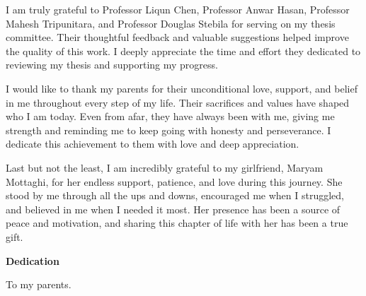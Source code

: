 I am truly grateful to Professor Liqun Chen, Professor Anwar Hasan, Professor Mahesh Tripunitara, and Professor Douglas Stebila for serving on my thesis committee. Their thoughtful feedback and valuable suggestions helped improve the quality of this work. I deeply appreciate the time and effort they dedicated to reviewing my thesis and supporting my progress.

I would like to thank my parents for their unconditional love, support, and belief in me throughout every step of my life. Their sacrifices and values have shaped who I am today. Even from afar, they have always been with me, giving me strength and reminding me to keep going with honesty and perseverance. I dedicate this achievement to them with love and deep appreciation.

Last but not the least, I am incredibly grateful to my girlfriend, Maryam Mottaghi, for her endless support, patience, and love during this journey. She stood by me through all the ups and downs, encouraged me when I struggled, and believed in me when I needed it most. Her presence has been a source of peace and motivation, and sharing this chapter of life with her has been a true gift.

\cleardoublepage
{}    %

\begin{center}\textbf{Dedication}\end{center}

To my parents.
\cleardoublepage
{}    %

\renewcommand\contentsname{Table of Contents}
\tableofcontents
\cleardoublepage
{}    %

\listoffigures
\cleardoublepage
{}		%

\listoftables
\cleardoublepage
{}		%

\renewcommand*{\abbreviationsname}{List of Abbreviations}
\printglossary[type=abbreviations]
\cleardoublepage
{}		%

\printglossary[type=symbols]
\cleardoublepage
{}		%



